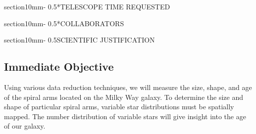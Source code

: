 \documentclass[letterpaper,11pt]{article}
\makeatletter
\renewcommand{\section}{\@startsection%
{section}{1}{0mm}{-\baselineskip}%
{0.5\baselineskip}{\normalfont\Large\bfseries}}%
\makeatother
\begin{document}
\section*{TELESCOPE TIME REQUESTED}

\section*{COLLABORATORS}
\begin{table}[H]\label{tab:collabs}
	\begin{center}
	\end{center}
\end{table}



\section{SCIENTIFIC JUSTIFICATION}

\subsection{Immediate Objective}
Using various data reduction techniques, we will measure the size, shape, and age of the spiral arms located on the Milky Way galaxy. To determine the size and shape of particular spiral arms, variable star distributions must be spatially mapped.  
The number distribution of variable stars will give insight into the age of our galaxy.
\end{document}
